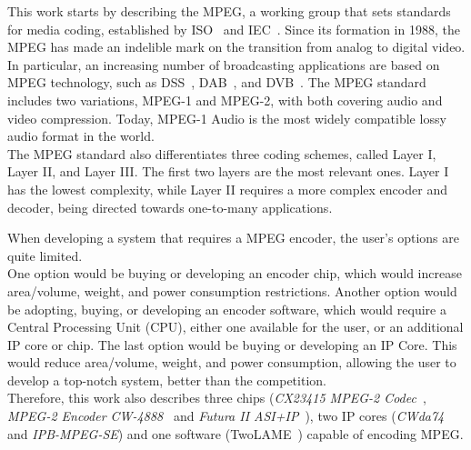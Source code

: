 
This work starts by describing the MPEG, a working group that sets standards for media coding, established by ISO~\cite{iso} and IEC~\cite{iec}. Since its formation in 1988, the MPEG has made an indelible mark on the transition from analog to digital video. In particular, an increasing number of broadcasting applications are based on MPEG technology, such as DSS~\cite{dss}, DAB~\cite{dab}, and DVB~\cite{dvb}.
The MPEG standard includes two variations, MPEG-1 and MPEG-2, with both covering audio and video compression. Today, MPEG-1 Audio is the most widely compatible lossy audio format in the world. \\
The MPEG standard also differentiates three coding schemes, called Layer I, Layer II, and Layer III.
The first two layers are the most relevant ones. Layer I has the lowest complexity, while Layer II requires a more complex encoder and decoder, being directed towards one-to-many applications.

When developing a system that requires a MPEG encoder, the user's options are quite limited.\\
One option would be buying or developing an encoder chip, which would increase area/volume, weight, and power consumption restrictions. 
Another option would be adopting, buying, or developing an encoder software, which would require a Central Processing Unit (CPU), either one available for the user, or an additional IP core or chip. 
The last option would be buying or developing an IP Core. This would reduce area/volume, weight, and power consumption, allowing the user to develop a top-notch system, better than the competition.\\
Therefore, this work also describes three chips (\textit{CX23415 MPEG-2 Codec}~\cite{cx23415}, \textit{MPEG-2 Encoder CW-4888}~\cite{cw4888} and \textit{Futura II ASI+IP}~\cite{futura}), two IP cores (\textit{CWda74} and \textit{IPB-MPEG-SE}) and one software (TwoLAME~\cite{twolame}) capable of encoding MPEG.

